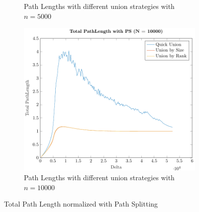 \begin{figure}[ht]
\begin{subfigure}{0.32\textwidth}
        \caption{Path Lengths with different union strategies with $n = 5000$}
    \end{subfigure}%
    \hfill
    \begin{subfigure}{0.32\textwidth}
        \centering
        \includegraphics[width=\textwidth]{../images/plotPSFull10000_PathLength.pdf}
        \caption{Path Lengths with different union strategies with $n = 10000$}
    \end{subfigure}

    \caption{Total Path Length normalized with Path Splitting}
    \label{fig:tplPS}
\end{figure}

